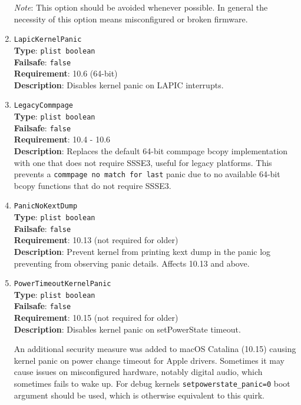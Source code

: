 \documentclass[]{article}
\begin{document}
\begin{enumerate}
  \emph{Note}: This option should be avoided whenever possible. In general the necessity
  of this option means misconfigured or broken firmware.

\item
  \texttt{LapicKernelPanic}\\
  \textbf{Type}: \texttt{plist\ boolean}\\
  \textbf{Failsafe}: \texttt{false}\\
  \textbf{Requirement}: 10.6 (64-bit)\\
  \textbf{Description}: Disables kernel panic on LAPIC interrupts.

\item
  \texttt{LegacyCommpage}\\
  \textbf{Type}: \texttt{plist\ boolean}\\
  \textbf{Failsafe}: \texttt{false}\\
  \textbf{Requirement}: 10.4 - 10.6\\
  \textbf{Description}: Replaces the default 64-bit commpage bcopy implementation with
  one that does not require SSSE3, useful for legacy platforms. This prevents a
  \texttt{commpage no match for last} panic due to no available 64-bit bcopy functions
  that do not require SSSE3.

\item
  \texttt{PanicNoKextDump}\\
  \textbf{Type}: \texttt{plist\ boolean}\\
  \textbf{Failsafe}: \texttt{false}\\
  \textbf{Requirement}: 10.13 (not required for older)\\
  \textbf{Description}: Prevent kernel from printing kext dump in the panic
  log preventing from observing panic details. Affects 10.13 and above.

\item
  \texttt{PowerTimeoutKernelPanic}\\
  \textbf{Type}: \texttt{plist\ boolean}\\
  \textbf{Failsafe}: \texttt{false}\\
  \textbf{Requirement}: 10.15 (not required for older)\\
  \textbf{Description}: Disables kernel panic on setPowerState timeout.

  An additional security measure was added to macOS Catalina (10.15) causing
  kernel panic on power change timeout for Apple drivers. Sometimes it may cause
  issues on misconfigured hardware, notably digital audio, which sometimes fails
  to wake up. For debug kernels \texttt{setpowerstate\_panic=0} boot argument
  should be used, which is otherwise equivalent to this quirk.


\end{enumerate}
\end{document}
